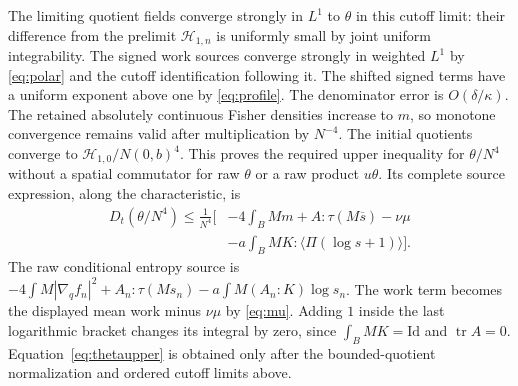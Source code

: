 \documentclass[11pt]{article}
\numberwithin{equation}{section}
\newcommand{\tr}{\operatorname{tr}}
\newcommand{\grad}{\nabla}
\newcommand{\Id}{\mathrm{Id}}
\newcommand{\pair}[1]{\langle #1\rangle}
\begin{document}
The limiting quotient fields converge strongly in $L^1$ to $\theta$ in this
cutoff limit: their difference from the prelimit $\mathcal H_{1,n}$ is uniformly
small by joint uniform integrability. The signed work sources converge strongly
in weighted $L^1$ by \eqref{eq:polar} and the cutoff identification following
it. The shifted signed terms have a uniform exponent above one by
\eqref{eq:profile}. The denominator error is $O(\delta/\kappa)$.
The retained absolutely continuous Fisher densities increase to $m$, so
monotone convergence remains valid after multiplication by $N^{-4}$.
The initial quotients converge to $\mathcal H_{1,0}/N(0,b)^4$.
This proves the required upper inequality for $\theta/N^4$ without a spatial
commutator for raw $\theta$ or a raw product $u\theta$.
Its complete source expression, along the characteristic, is
\begin{equation}\label{eq:thetaupper}
\begin{aligned}
 D_t(\theta/N^4)\leq\frac1{N^4}\biggl[
 &-4\int_BMm+A:\tau(M\overline s)-\nu\mu\\
 &-a\int_BMK:\pair{\Pi(\log s+1)}\biggr].
\end{aligned}
\end{equation}
The raw conditional entropy source is
$-4\int M|\grad_qf_n|^2+A_n:\tau(Ms_n)
 -a\int M(A_n:K)\log s_n$.
The work term becomes the displayed mean work minus $\nu\mu$ by
\eqref{eq:mu}. Adding $1$ inside the last logarithmic bracket changes its
integral by zero, since $\int_BMK=\Id$ and $\tr A=0$.
Equation~\eqref{eq:thetaupper} is obtained only after the bounded-quotient
normalization and ordered cutoff limits above.
\end{document}
